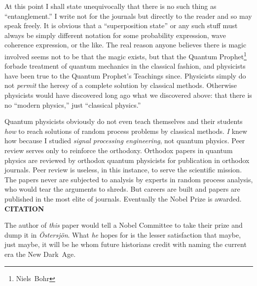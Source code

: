 \documentclass[9pt,technote]{IEEEtran}
\begin{document}
At this point I shall state unequivocally that there is no such thing
as ``entanglement.'' I write not for the journals but directly to the
reader and so may speak freely. It is obvious that a ``superposition
state'' or any such stuff must always be simply different notation for
some probability expression, wave coherence expression, or the
like. The real reason anyone believes there is magic involved seems
not to be that the magic exists, but that the Quantum
Prophet\footnote{Niels~Bohr} forbade treatment of quantum mechanics in
the classical fashion, and physicists have been true to the Quantum
Prophet’s Teachings since. Physicists simply do not {\em{permit}} the
heresy of a complete solution by classical methods. Otherwise
physicists would have discovered long ago what we discovered above:
that there is no ``modern physics,'' just ``classical physics.''

Quantum physicists obviously do not even teach themselves and their
students {\em{how}} to reach solutions of random process problems by
classical methods. {\em{I}} knew how because I studied {\em{signal
    processing engineering}}, not quantum physics. Peer review serves
only to reinforce the orthodoxy. Orthodox papers in quantum physics
are reviewed by orthodox quantum physicists for publication in
orthodox journals. Peer review is useless, in this instance, to serve
the scientific mission. The papers never are subjected to analysis by
experts in random process analysis, who would tear the arguments to
shreds. But careers are built and papers are published in the most
elite of journals. Eventually the Nobel Prize is
awarded. {\bf{CITATION}}

The author of {\em{this}} paper would tell a Nobel Committee to take
their prize and dump it in {\em{Östersjön}}. What {\em{he}} hopes for
is the lesser satisfaction that maybe, just maybe, it will be he whom
future historians credit with naming the current era the New Dark~Age.
\end{document}
